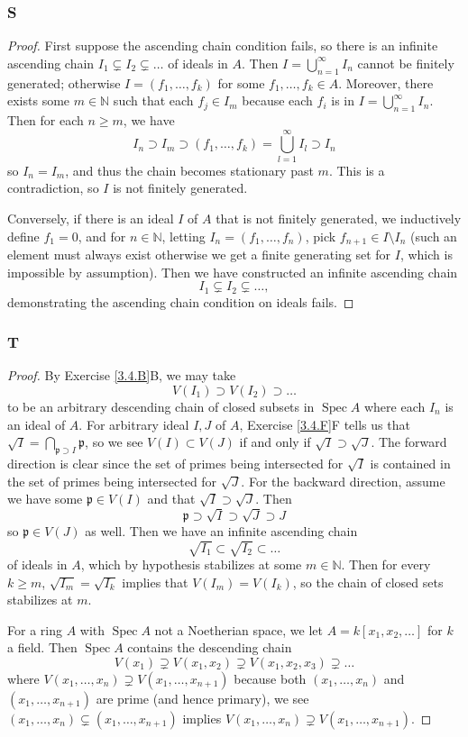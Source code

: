 \documentclass{article}
\newcommand{\N}{\mathbb{N}}
\newcommand{\frkp}{\mathfrak{p}}
\DeclareMathOperator{\Spec}{\mathrm{Spec}}
\theoremstyle{definition} %
\begin{document}
\subsubsection{S}\label{3.6.S}
\begin{proof}
    First suppose the ascending chain condition fails, so there is an infinite ascending chain $I_1 \subsetneq I_2 \subsetneq \dots$ of ideals in $A$. Then $I=\bigcup_{n=1}^\infty I_n$ cannot be finitely generated; otherwise $I = (f_1, \dots, f_k)$ for some $f_1,\dots, f_k\in A$. Moreover, there exists some $m\in \N$ such that each $f_j \in I_m$ because each $f_i$ is in $I=\bigcup_{n=1}^\infty I_n$. Then for each $n\ge m$, we have $$I_n\supset I_m \supset (f_1,\dots,f_k)=\bigcup_{l=1}^\infty I_l \supset I_n$$ so $I_n=I_m$, and thus the chain becomes stationary past $m$. This is a contradiction, so $I$ is not finitely generated.

    

    Conversely, if there is an ideal $I$ of $A$ that is not finitely generated, we inductively define $f_1=0$, and for $n\in \N$, letting $I_n=(f_1,\dots, f_n)$, pick $f_{n+1} \in I\setminus I_n$ (such an element must always exist otherwise we get a finite generating set for $I$, which is impossible by assumption). Then we have constructed an infinite ascending chain $$I_1 \subsetneq I_2 \subsetneq \dots,$$ demonstrating the ascending chain condition on ideals fails.
\end{proof}
\subsubsection{T}\label{3.6.T}
\begin{proof}
    By Exercise \ref{3.4.B}B, we may take
    \[
    V(I_1)\supset V(I_2)\supset \dots
    \]
    to be an arbitrary descending chain of closed subsets in $\Spec A$ where each $I_n$ is an ideal of $A$. For arbitrary ideal $I,J$ of $A$, Exercise \ref{3.4.F}F tells us that $\sqrt{I}=\bigcap_{\frkp \supset I} \frkp$, so we see $V(I)\subset V(J)$ if and only if $\sqrt{I}\supset \sqrt{J}$. The forward direction is clear since the set of primes being intersected for $\sqrt{I}$ is contained in the set of primes being intersected for $\sqrt{J}$. For the backward direction, assume we have some $\frkp\in V(I)$ and that $\sqrt{I}\supset \sqrt{J}$. Then
    \[
    \frkp \supset \sqrt{I}\supset \sqrt{J} \supset J
    \]
    so $\frkp \in V(J)$ as well. Then we have an infinite ascending chain 
    \[
    \sqrt{I_1}\subset \sqrt{I_2}\subset \dots
    \]
    of ideals in $A$, which by hypothesis stabilizes at some $m\in \N$. Then for every $k\ge m$, $\sqrt{I_m}=\sqrt{I_k}$ implies that $V(I_m)=V(I_k)$, so the chain of closed sets stabilizes at $m$.

    For a ring $A$ with $\Spec A$ not a Noetherian space, we let $A=k[x_1,x_2,\dots]$ for $k$ a field. Then $\Spec A$ contains the descending chain
    \[
    V(x_1)\supsetneq V(x_1,x_2)\supsetneq V(x_1,x_2,x_3)\supsetneq \dots
    \]
    where $V(x_1,\dots,x_n)\supsetneq V(x_1,\dots, x_{n+1})$ because both $(x_1,\dots, x_n)$ and $(x_1,\dots, x_{n+1})$ are prime (and hence primary), we see $(x_1,\dots, x_n)\subsetneq  (x_1, \dots, x_{n+1})$ implies $V(x_1, \dots, x_n) \supsetneq V(x_1, \dots, x_{n+1})$.
\end{proof}
\end{document}
